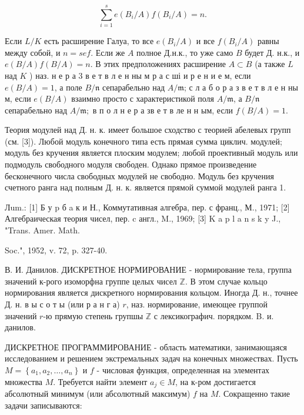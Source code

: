 \documentclass[10pt]{article}
\begin{document}
\[

\sum_{i=1}^{s} e\left(B_{i} / A\right) f\left(B_{i} / A\right)=n .

\]



Если $L / K$ есть расширение Галуа, то все $e\left(B_{i} / A\right)$ и все $f\left(B_{i} / A\right)$ равны между собой, и $n=s e f$. Если же $A$ полное Д.н.к., то уже само $B$ будет Д. н.к., и $e(B / A) f(B / A)=n$. В этих предположениях расширение $A \subset B$ (а также $L$ над $K$ ) наз. н е р а 3 в е т в л е н ны м р а с ші и р е н и е м, если $e(B / A)=1$, а поле $B / \mathfrak{n}$ сепарабельно над $A / \mathfrak{m}$; с л а б о р а з в е т в л е н ны м, если $e(B / A)$ взаимно просто с характеристикой поля $A / \mathfrak{m}$, а $B / \mathfrak{n}$ сепарабельно над $A / \mathfrak{m} ;$ в п о л н е р а зв е т в ле н н ым, если $f(B / A)=1$.



Теория модулей над Д. н. к. имеет большое сходство с теорией абелевых групп (см. [3]). Любой модуль конечного типа есть прямая сумма циклич. модулей; модуль без кручения является плоским модулем; любой проективный модуль или подмодуль свободного модуля свободен. Однако прямое произведение бесконечного числа свободных модулей не свободно. Модуль без кручения счетного ранга над полным Д. н. к. является прямой суммой модулей ранга 1.



Лum.: [1] Б у p б a к и Н., Коммутативная алгебра, пер. с франц., М., 1971; [2] Алгебраическая теория чисел, пер. c англ., M., 1969; [3] K a p l a n s k y J., "Trans. Amer. Math.

Soc.", 1952, v. 72, p. 327-40.

В. И. Данилов. ДИСКРЕТНОЕ НОРМИРОВАНИЕ - нормирование тела, группа значений к-рого изоморфна группе целых чисел $\mathbb{Z}$. В этом случае кольцо нормирования является дискретного нормирования кольцом. Иногда Д. н., точнее Д. н. в ы с о т ы (или р а н г а) $r$, наз. нормирование, имеющее группой значений $r$-ю прямую степень групшы $\mathbb{Z}$ с лексикографич. порядком. B. и. данилов.



ДИСКРЕТНОЕ ПРОГРАММИРОВАНИЕ - область математики, занимающаяся исследованием и решением экстремальных задач на конечных множествах. Пусть $M=\left\{a_{1}, a_{2}, \ldots, a_{n}\right\}$ и $f$ - числовая функция, определенная на элементах множества $M$. Требуется найти элемент $a_{j} \in M$, на к-ром достигается абсолютный минимум (или абсолютный максимум) $f$ на $M$. Сокращенно такие задачи записываются:
\end{document}
